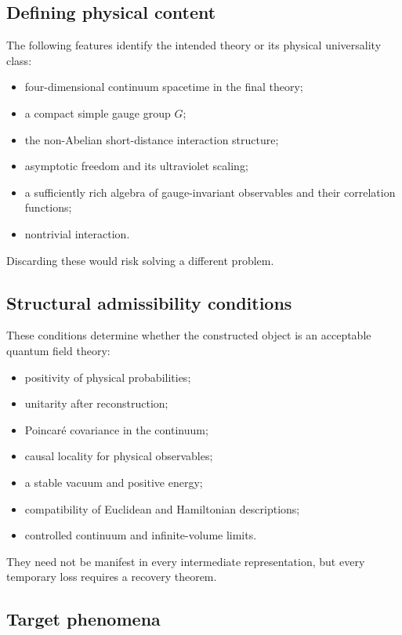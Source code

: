 \documentclass[11pt]{article}
\begin{document}
\subsection{Defining physical content}

The following features identify the intended theory or its physical
universality class:
\begin{itemize}[leftmargin=2em]
  \item four-dimensional continuum spacetime in the final theory;
  \item a compact simple gauge group $G$;
  \item the non-Abelian short-distance interaction structure;
  \item asymptotic freedom and its ultraviolet scaling;
  \item a sufficiently rich algebra of gauge-invariant observables and their
        correlation functions;
  \item nontrivial interaction.
\end{itemize}
Discarding these would risk solving a different problem.

\subsection{Structural admissibility conditions}

These conditions determine whether the constructed object is an acceptable
quantum field theory:
\begin{itemize}[leftmargin=2em]
  \item positivity of physical probabilities;
  \item unitarity after reconstruction;
  \item Poincar\'e covariance in the continuum;
  \item causal locality for physical observables;
  \item a stable vacuum and positive energy;
  \item compatibility of Euclidean and Hamiltonian descriptions;
  \item controlled continuum and infinite-volume limits.
\end{itemize}
They need not be manifest in every intermediate representation, but every
temporary loss requires a recovery theorem.

\subsection{Target phenomena}
\end{document}
